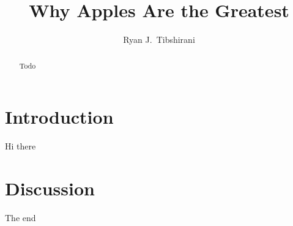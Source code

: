 \documentclass{article}
\title{Why Apples Are the Greatest}
\author{Ryan J.\ Tibshirani}
\date{}
\begin{document}
\maketitle

\begin{abstract}
Todo 
\end{abstract}

\section{Introduction} 

Hi there 

\section{Discussion} 

The end


      
\end{document}
